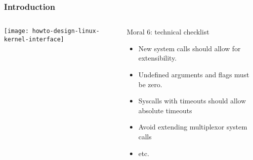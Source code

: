 \begin{frame}[plain]
	\frametitle{Introduction}
	
	
	
	\begin{columns}
		
		\begin{column}{.4\textwidth}
			
			\texttt{[image: howto-design-linux-kernel-interface]}
			
		\end{column}
		
		\begin{column}{.6\textwidth}
			\large
			\begin{block}{Moral 6: technical checklist	}
			\begin{itemize}
			\item New system calls should allow for extensibility. 

			\item Undefined arguments and flags must be zero. 
			\item Syscalls with timeouts should allow absolute timeouts 
			\item Avoid extending multiplexor system calls
			\item etc.
		    \end{itemize}
			\end{block} 
			
			

		\end{column}
		
		
	\end{columns}
	
	
\end{frame}

